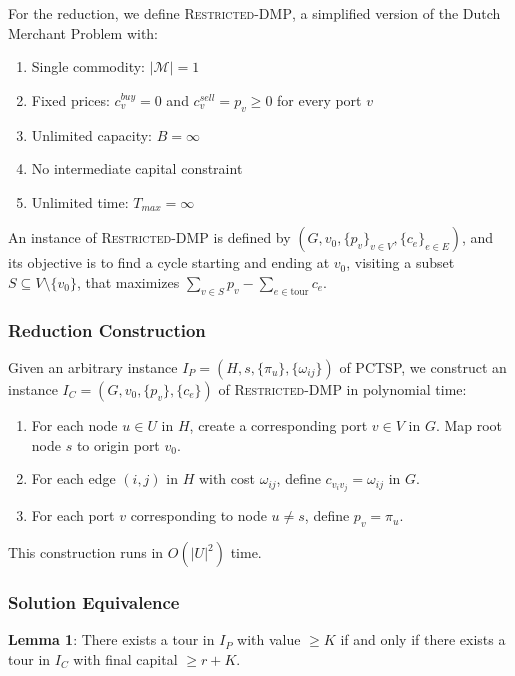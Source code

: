 \documentclass[12pt]{article}
\begin{document}
For the reduction, we define \textsc{Restricted-DMP}, a simplified version of the Dutch Merchant Problem with:
\begin{enumerate}
    \item Single commodity: $|\mathcal{M}| = 1$
    \item Fixed prices: $c^{buy}_v = 0$ and $c^{sell}_v = p_v \geq 0$ for every port $v$
    \item Unlimited capacity: $B = \infty$
    \item No intermediate capital constraint
    \item Unlimited time: $T_{max} = \infty$
\end{enumerate}

An instance of \textsc{Restricted-DMP} is defined by $(G, v_0, \{p_v\}_{v \in V}, \{c_e\}_{e \in E})$, and its objective is to find a cycle starting and ending at $v_0$, visiting a subset $S \subseteq V \setminus \{v_0\}$, that maximizes $\sum_{v \in S} p_v - \sum_{e \in \text{tour}} c_e$.

\subsubsection{Reduction Construction}

Given an arbitrary instance $I_P = (H, s, \{\pi_u\}, \{\omega_{ij}\})$ of PCTSP, we construct an instance $I_C = (G, v_0, \{p_v\}, \{c_e\})$ of \textsc{Restricted-DMP} in polynomial time:

\begin{enumerate}
    \item For each node $u \in U$ in $H$, create a corresponding port $v \in V$ in $G$. Map root node $s$ to origin port $v_0$.
    \item For each edge $(i,j)$ in $H$ with cost $\omega_{ij}$, define $c_{v_i v_j} = \omega_{ij}$ in $G$.
    \item For each port $v$ corresponding to node $u \neq s$, define $p_v = \pi_u$.
\end{enumerate}

This construction runs in $O(|U|^2)$ time.

\subsubsection{Solution Equivalence}

\textbf{Lemma 1}: There exists a tour in $I_P$ with value $\geq K$ if and only if there exists a tour in $I_C$ with final capital $\geq r + K$.
\end{document}
